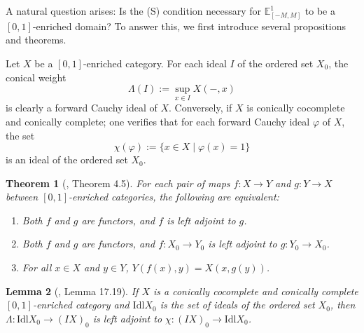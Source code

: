 \documentclass[preprint,3p,times]{elsarticle}
\theoremstyle{plain}
\newtheorem{thm}{Theorem}[section]
\newtheorem{lem}[thm]{Lemma}
\theoremstyle{definition}
\renewcommand{\phi}{\varphi}
\numberwithin{equation}{section}
\begin{document}
A natural question arises: Is  the (S) condition necessary  for \(\mathbb{E}^1_{[-M,M]}\) to be a \([0,1]\)-enriched domain? To answer this, we first introduce several propositions and theorems.

Let \(X\) be a \([0,1]\)-enriched category. For each ideal \(I\) of the ordered set \(X_0\), the conical weight
\[
\Lambda(I) := \sup_{x \in I} X(-, x)
\]
is clearly a forward Cauchy ideal of \(X\). Conversely, if \(X\) is  conically  cocomplete and  conically complete; one verifies that for each forward Cauchy ideal \(\phi\) of \(X\), the set
\[
\chi(\phi) := \{ x \in X \mid \phi(x) = 1 \}
\]
is an ideal of the ordered set \(X_0\). 
\begin{thm}[\cite{Zhang2024IntroductoryNO}, Theorem 4.5]\label{adjoint relation between fuzzy order and crisp order}
    For each pair of maps \(f: X \to Y\) and \(g: Y \to X\) between \([0,1]\)-enriched categories, the following are equivalent:
\begin{enumerate}[label={\rm(\arabic*)}]
    \item Both \(f\) and \(g\) are functors, and \(f\) is left adjoint to \(g\).
    \item Both \(f\) and \(g\) are functors, and \(f: X_0 \to Y_0\) is left adjoint to \(g: Y_0 \to X_0\).
    \item For all \(x \in X\) and \(y \in Y\), \(Y(f(x), y) = X(x, g(y))\).
\end{enumerate}
\end{thm}

\begin{lem}[\cite{Zhang2024IntroductoryNO}, Lemma 17.19]
    If \(X\) is a  conically  cocomplete and  conically complete \([0,1]\)-enriched category and  \(\mathrm{Idl} X_0\) is the set of ideals of the ordered set \(X_0\), then \(\Lambda: \mathrm{Idl} X_0 \to (IX)_0\) is left adjoint to \(\chi: (IX)_0 \to \mathrm{Idl} X_0\).
\end{lem}
\end{document}
